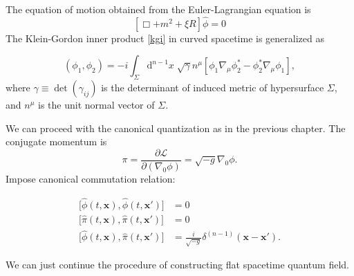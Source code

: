 \documentclass[12pt]{article}
\numberwithin{equation}{subsection}
\theoremstyle{mystyle}{\newtheorem{definition}{Definition}[subsection]}
\theoremstyle{mystyle}{\newtheorem{theorem}[definition]{Theorem}}
\theoremstyle{mystyle}{\newtheorem*{remark}{Remark}}
\theoremstyle{mystyle}{\newtheorem{example}{Example}[subsection]}
\theoremstyle{mystyle}{\newtheorem{examples}{Examples}[subsection]}
\theoremstyle{mystyle}{\newtheorem{cthm}{}[subsection]}
\newcommand{\p}{\partial}
\newcommand{\id}{\mathrm{d}}
\begin{document}
The equation of motion obtained from the Euler-Lagrangian equation is
\begin{equation}
  \left[\Box+m^2+\xi R\right]\hat{\phi}=0
\end{equation}
The Klein-Gordon inner product \ref{kgi} in curved spacetime is generalized as
\begin{definition}
  \[(\phi_1,\phi_2)=-i\int_{\Sigma}\id^{n-1}x\;\sqrt{\gamma}n^{\mu}\left[\phi_1\nabla_\mu\phi^*_2-\phi_2^*\nabla_\mu\phi_1\right],\]
  where \(\gamma\equiv \det(\gamma_{ij})\) is the determinant of induced metric of hypersurface \(\Sigma\),
  and \(n^{\mu}\) is the unit normal vector of \(\Sigma\).
\end{definition}

We can proceed with the canonical quantization as in the previous chapter.
The conjugate momentum is
\begin{equation}
  \pi=\frac{\p \mathcal{L}}{\p(\nabla_{0}\phi)}=\sqrt{-g}\nabla_{0}\phi.
\end{equation}
Impose canonical commutation relation:
\begin{cthm}\label{cccr}
  \begin{align*}
    \bigl[\hat{\phi}(t,\mathbf{x}),\hat{\phi}(t,\mathbf{x'})\bigr] & =0                                                          \\
    \bigl[\hat{\pi}(t,\mathbf{x}),\hat{\pi}(t,\mathbf{x'})\bigr]   & =0                                                          \\
    \bigl[\hat{\phi}(t,\mathbf{x}),\hat{\pi}(t,\mathbf{x'})\bigr]  & =\frac{i}{\sqrt{-g}}\delta^{(n-1)}(\mathbf{x}-\mathbf{x'}).
  \end{align*}
\end{cthm}
We can just continue the procedure of constructing flat spacetime quantum field.
\end{document}
